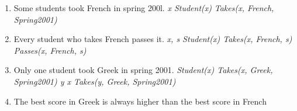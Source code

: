 \documentclass{article}
\begin{document}
\begin{enumerate}
  \item Some students took French in spring 200l.
  \exists \textit{x Student(x)} \land \textit{Takes(x, French, Spring2001)}

  \item Every student who takes French passes it.
  \forall \textit{x, s Student(x) \land Takes(x, French, s) \to Passes(x, French, s)}

  \item Only one student took Greek in spring 2001.
  \exists \textit{Student(x) \land Takes(x, Greek, Spring2001) \land \forall y \ne x \to \lnot Takes(y, Greek, Spring2001)}

  \item The best score in Greek is always higher than the best score in French
\end{enumerate}
\end{document}
